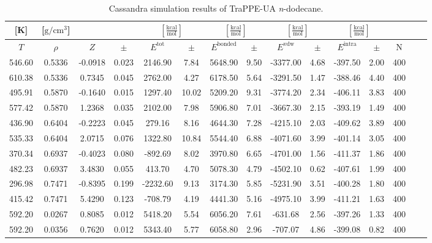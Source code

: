 \documentclass[%
 aip,
 jcp,
 sd,%
 amsmath,amssymb,
]{revtex4-1}
\begin{document}
\begin{table*}[!htbp]
\centering
\caption{Cassandra simulation results of TraPPE-UA \textit{n}-dodecane.}
\label{tab:sim-res-TraPPE-C12}
\begin{ruledtabular}
\begin{tabular}{ccccccccccccccc}
[K] & [$\mathrm{g/cm^3}$] &  &  & \multicolumn{2}{c}{$[\frac{\mathrm{kcal}}{\mathrm{mol}}]$} & \multicolumn{2}{c}{$[\frac{\mathrm{kcal}}{\mathrm{mol}}]$} & \multicolumn{2}{c}{$[\frac{\mathrm{kcal}}{\mathrm{mol}}]$} &\multicolumn{2}{c}{$[\frac{\mathrm{kcal}}{\mathrm{mol}}]$} & \\
\hline
$T$ & $\rho$ & $Z$ & $\pm$ & $E^{\mathrm{tot}}$ & $\pm$ & $E^{\mathrm{bonded}}$ & $\pm$ & $E^{\mathrm{vdw}}$ & $\pm$ & $E^{\mathrm{intra}}$ & $\pm$ & N\\
\hline
546.60	&	0.5336	&	-0.0918	&	0.023	&	2146.90	&	7.84	&	5648.90	&	9.50	&	-3377.00	&	4.68	&	-397.50	&	2.00	&	400	\\
610.38	&	0.5336	&	0.7345	&	0.045	&	2762.00	&	4.27	&	6178.50	&	5.64	&	-3291.50	&	1.47	&	-388.46	&	4.40	&	400	\\
495.91	&	0.5870	&	-0.1640	&	0.015	&	1297.40	&	10.02	&	5209.20	&	9.31	&	-3774.20	&	2.34	&	-406.11	&	3.83	&	400	\\
577.42	&	0.5870	&	1.2368	&	0.035	&	2102.00	&	7.98	&	5906.80	&	7.01	&	-3667.30	&	2.15	&	-393.19	&	1.49	&	400	\\
436.90	&	0.6404	&	-0.2223	&	0.045	&	279.16	&	8.16	&	4644.30	&	7.28	&	-4215.10	&	2.03	&	-409.62	&	3.89	&	400	\\
535.33	&	0.6404	&	2.0715	&	0.076	&	1322.80	&	10.84	&	5544.40	&	6.88	&	-4071.60	&	3.99	&	-401.14	&	3.05	&	400	\\
370.34	&	0.6937	&	-0.4023	&	0.080	&	-892.69	&	8.02	&	3970.80	&	6.65	&	-4701.00	&	1.56	&	-411.37	&	1.86	&	400	\\
482.23	&	0.6937	&	3.4830	&	0.055	&	413.70	&	4.70	&	5078.30	&	4.79	&	-4502.10	&	0.62	&	-407.61	&	1.99	&	400	\\
296.98	&	0.7471	&	-0.8395	&	0.199	&	-2232.60	&	9.13	&	3174.30	&	5.85	&	-5231.90	&	3.51	&	-400.28	&	1.80	&	400	\\
415.42	&	0.7471	&	5.4290	&	0.123	&	-708.79	&	4.19	&	4441.30	&	5.16	&	-4975.10	&	3.99	&	-411.21	&	1.63	&	400	\\
592.20	&	0.0267	&	0.8085	&	0.012	&	5418.20	&	5.54	&	6056.20	&	7.61	&	-631.68	&	2.56	&	-397.26	&	1.33	&	400	\\
592.20	&	0.0356	&	0.7620	&	0.012	&	5343.40	&	5.77	&	6058.80	&	2.96	&	-707.07	&	4.86	&	-399.08	&	0.82	&	400	\\

\end{tabular}
\end{ruledtabular}
\end{table*}
\end{document}
